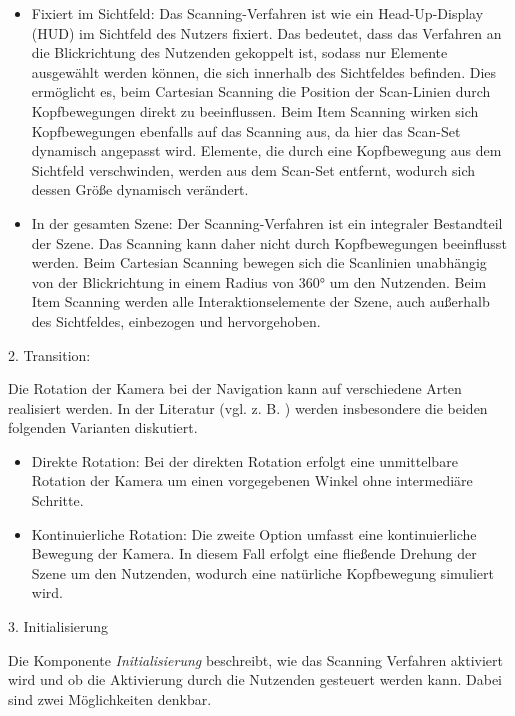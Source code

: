 \begin{itemize}
    \item Fixiert im Sichtfeld: Das Scanning-Verfahren ist wie ein Head-Up-Display (HUD) im Sichtfeld des Nutzers fixiert. Das bedeutet, dass das Verfahren an die Blickrichtung des Nutzenden gekoppelt ist, sodass nur Elemente ausgewählt werden können, die sich innerhalb des Sichtfeldes befinden. Dies ermöglicht es, beim Cartesian Scanning die Position der Scan-Linien durch Kopfbewegungen direkt zu beeinflussen. Beim Item Scanning wirken sich Kopfbewegungen ebenfalls auf das Scanning aus, da hier das Scan-Set dynamisch angepasst wird. Elemente, die durch eine Kopfbewegung aus dem Sichtfeld verschwinden, werden aus dem Scan-Set entfernt, wodurch sich dessen Größe dynamisch verändert.
    \item In der gesamten Szene: Der Scanning-Verfahren ist ein integraler Bestandteil der Szene. Das Scanning kann daher nicht durch Kopfbewegungen beeinflusst werden. Beim Cartesian Scanning bewegen sich die Scanlinien unabhängig von der Blickrichtung in einem Radius von 360° um den Nutzenden. Beim Item Scanning werden alle Interaktionselemente der Szene, auch außerhalb des Sichtfeldes, einbezogen und hervorgehoben. 
\end{itemize}

2. Transition: 

Die Rotation der Kamera bei der Navigation kann auf verschiedene Arten realisiert werden. In der Literatur (vgl. z. B. \citet{10.1145/3441852.3471230, 10.1007/s10055-020-00425-x, 8797722}) werden insbesondere die beiden folgenden Varianten diskutiert.

\begin{itemize}
    \item Direkte Rotation: Bei der direkten Rotation erfolgt eine unmittelbare Rotation der Kamera um einen vorgegebenen Winkel ohne intermediäre Schritte. 
    \item Kontinuierliche Rotation: Die zweite Option umfasst eine kontinuierliche Bewegung der Kamera. In diesem Fall erfolgt eine fließende Drehung der Szene um den Nutzenden, wodurch eine natürliche Kopfbewegung simuliert wird. 
\end{itemize}

3. Initialisierung 

Die Komponente \textit{Initialisierung} beschreibt, wie das Scanning Verfahren aktiviert wird und ob die Aktivierung durch die Nutzenden gesteuert werden kann. Dabei sind zwei Möglichkeiten denkbar. 

